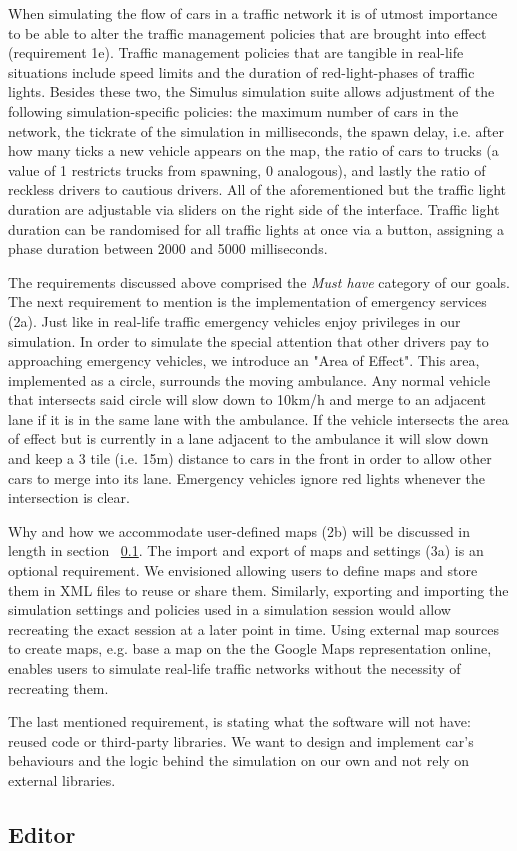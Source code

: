 When simulating the flow of cars in a traffic network it is of utmost importance to be able to alter the traffic management policies that are brought into effect (requirement 1e). Traffic management policies that are tangible in real-life situations include speed limits and the duration of red-light-phases of traffic lights. Besides these two, the Simulus simulation suite allows adjustment of the following simulation-specific policies: the maximum number of cars in the network, the tickrate of the simulation in milliseconds, the spawn delay, i.e. after how many ticks a new vehicle appears on the map, the ratio of cars to trucks (a value of 1 restricts trucks from spawning, 0 analogous), and lastly the ratio of reckless drivers to cautious drivers. All of the aforementioned but the traffic light duration are adjustable via sliders on the right side of the interface. Traffic light duration can be randomised for all traffic lights at once via a button, assigning a phase duration between 2000 and 5000 milliseconds.

The requirements discussed above comprised the \textit{Must have} category of our goals. The next requirement to mention is the implementation of emergency services (2a). Just like in real-life traffic emergency vehicles enjoy privileges in our simulation. In order to simulate the special attention that other drivers pay to approaching emergency vehicles, we introduce an "Area of Effect". This area, implemented as a circle, surrounds the moving ambulance. Any normal vehicle that intersects said circle will slow down to 10km/h and merge to an adjacent lane if it is in the same lane with the ambulance. If the vehicle intersects the area of effect but is currently in a lane adjacent to the ambulance it will slow down and keep a 3 tile (i.e. 15m) distance to cars in the front in order to allow other cars to merge into its lane. Emergency vehicles ignore red lights whenever the intersection is clear.

Why and how we accommodate user-defined maps (2b) will be discussed in length in section ~\ref{ss:req-editor}. The import and export of maps and settings (3a) is an optional requirement. We envisioned allowing users to define maps and store them in XML files to reuse or share them. Similarly, exporting and importing the simulation settings and policies used in a simulation session would allow recreating the exact session at a later point in time. Using external map sources to create maps, e.g. base a map on the the Google Maps representation online, enables users to simulate real-life traffic networks without the necessity of recreating them.

The last mentioned requirement, is stating what the software will not have: reused code or third-party libraries. We want to design and implement car's behaviours and the logic behind the simulation on our own and not rely on external libraries.

\subsection{Editor}\label{ss:req-editor}
